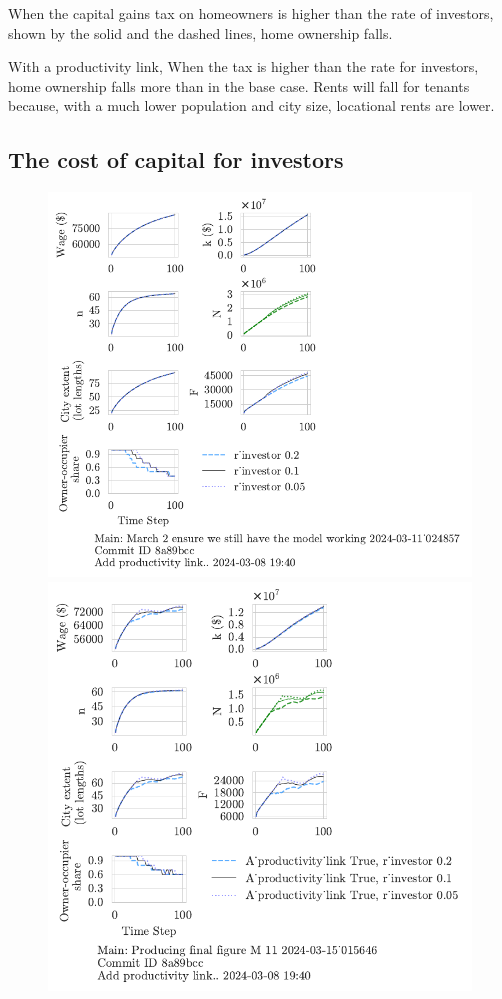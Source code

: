 When the capital gains tax on homeowners is higher than the rate of investors, shown by the solid and the dashed lines,  home ownership falls. 

With a productivity link,  When the tax is higher than the rate for investors,  home ownership falls more than in the base case.  Rents will fall for tenants because, with a much lower population and city size, locational rents are lower.

\newpage
\subsection{The cost of capital for investors}
\begin{figure}[h!tb] 
    \centering
    \includegraphics[scale=.75, trim={0 1.4cm 4cm 0},clip]{fig/r_investor-Main-024857.pdf} 
    \includegraphics[scale=.75, trim={0 1.4cm 3.5cm 0},clip]{fig/With-productivity_link-r_investor-15_015646.pdf} 

\end{figure}

